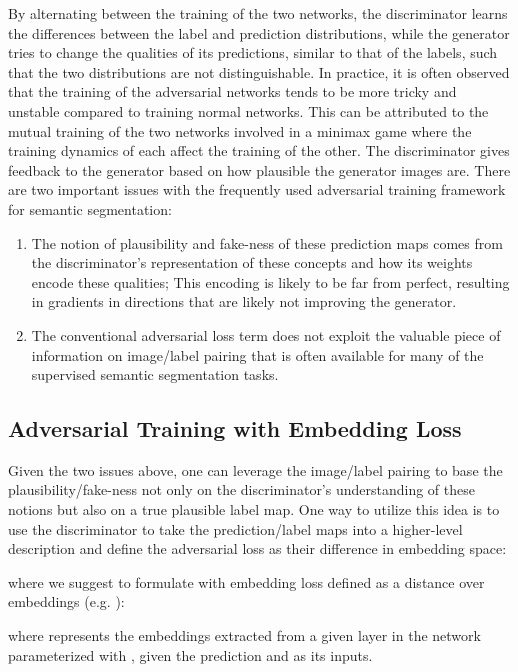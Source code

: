 \documentclass{article} \usepackage{nips13submit_e,times}
\begin{document}
By alternating between the training of the two networks, the discriminator learns the differences between the label and prediction distributions, while the generator tries to change the qualities of its predictions, similar to that of the labels, such that the two distributions are not distinguishable.
In practice, it is often observed that the training of the adversarial networks tends to be more tricky and unstable compared to training normal networks.
This can be attributed to the mutual training of the two networks involved in a minimax game where the training dynamics of each affect the training of the other.
The discriminator gives feedback to the generator based on how plausible the generator images are.
There are two important issues with the frequently used adversarial training framework for semantic segmentation:
\begin{enumerate}
  \item
  The notion of plausibility and fake-ness of these prediction maps comes from the discriminator's representation of these concepts and how its weights encode these qualities;
  This encoding is likely to be far from perfect, resulting in gradients in directions that are likely not improving the generator.
  \item
  The conventional adversarial loss term does not exploit the valuable piece of information on image/label pairing that is often available for many of the supervised semantic segmentation tasks.
\end{enumerate}



\subsection{Adversarial Training with Embedding Loss}

Given the two issues above, one can leverage the image/label pairing to base the plausibility/fake-ness not only on the discriminator's understanding of these notions but also on a true plausible label map.
One way to utilize this idea is to use the discriminator to take the prediction/label maps into a higher-level description and define the adversarial loss as their difference in embedding space:

where we suggest to formulate  with embedding loss  defined as a distance over embeddings (e.g. ):

where  represents the embeddings extracted from a given layer in the network  parameterized with , given the prediction  and  as its inputs.
\end{document}
